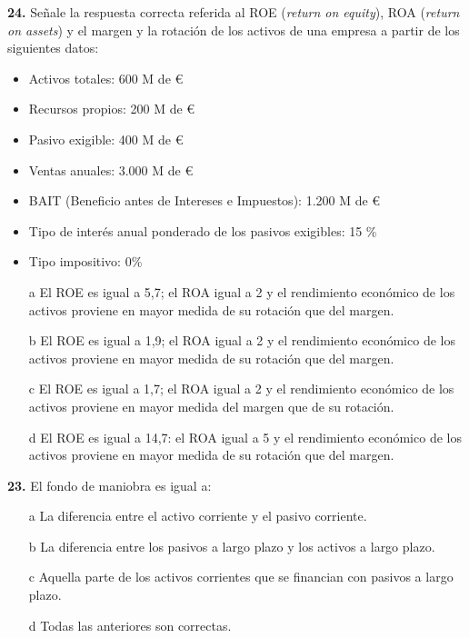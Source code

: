 \documentclass{nuevotema}
\begin{document}
\preguntas


\textbf{24.} Señale la respuesta correcta referida al ROE (\textit{return on equity}), ROA (\textit{return on assets}) y el margen y la rotación de los activos de una empresa a partir de los siguientes datos:

\begin{itemize}
	\item Activos totales: 600 M de €
	\item Recursos propios: 200 M de €
	\item Pasivo exigible: 400 M de €
	\item Ventas anuales: 3.000 M de €
	\item BAIT (Beneficio antes de Intereses e Impuestos): 1.200 M de €
	\item Tipo de interés anual ponderado de los pasivos exigibles: 15 \%
	\item Tipo impositivo: 0\%
\end{itemize}

\begin{enumerate}
	\item[a] El ROE es igual a 5,7; el ROA igual a 2 y el rendimiento económico de los activos proviene en mayor medida de su rotación que del margen.
	\item[b] El ROE es igual a 1,9; el ROA igual a 2 y el rendimiento económico de los activos proviene en mayor medida de su rotación que del margen.
	\item[c] El ROE es igual a 1,7; el ROA igual a 2 y el rendimiento económico de los activos proviene en mayor medida del margen que de su rotación.
	\item[d] El ROE es igual a 14,7: el ROA igual a 5 y el rendimiento económico de los activos proviene en mayor medida de su rotación que del margen.
\end{enumerate}


\textbf{23.} El fondo de maniobra es igual a:
\begin{enumerate}
	\item[a] La diferencia entre el activo corriente y el pasivo corriente.
	\item[b] La diferencia entre los pasivos a largo plazo y los activos a largo plazo.
	\item[c] Aquella parte de los activos corrientes que se financian con pasivos a largo plazo.
	\item[d] Todas las anteriores son correctas.
\end{enumerate}
\end{document}
